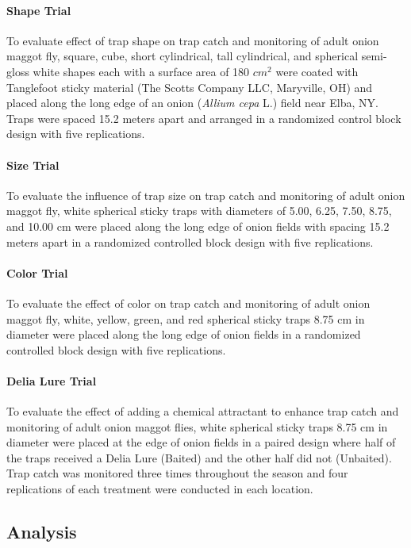 \documentclass[alpha-refs]{wiley-article}
\begin{document}
\paragraph{Shape Trial} To evaluate effect of trap shape on trap catch and monitoring of adult onion maggot fly, square, cube, short cylindrical, tall cylindrical, and spherical semi-gloss white shapes each with a surface area of 180 $cm^2$  were coated with Tanglefoot sticky material (The Scotts Company LLC, Maryville, OH) and placed along the long edge of an onion (\textit{Allium cepa} L.) field near Elba, NY. Traps were spaced 15.2 meters apart and arranged in a randomized control block design with five replications.   

\paragraph{Size Trial}
To evaluate the influence of trap size on trap catch and monitoring of adult onion maggot fly, white spherical sticky traps with diameters of 5.00, 6.25, 7.50, 8.75, and 10.00 cm were placed along the long edge of onion fields with spacing 15.2 meters apart in a randomized controlled block design with five replications.  

\paragraph{Color Trial}
To evaluate the effect of color on trap catch and monitoring of adult onion maggot fly, white, yellow, green, and red spherical sticky traps 8.75 cm in diameter were placed along the long edge of onion fields in a randomized controlled block design with five replications.  

\paragraph{Delia Lure Trial}
To evaluate the effect of adding a chemical attractant to enhance trap catch and monitoring of adult onion maggot flies, white spherical sticky traps 8.75 cm in diameter were placed at the edge of onion fields in a paired design where half of the traps received a Delia Lure (Baited) and the other half did not (Unbaited). Trap catch was monitored three times throughout the season and four replications of each treatment were conducted in each location.  


\subsection{Analysis}
\end{document}
